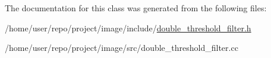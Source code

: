 The documentation for this class was generated from the following files\+:\begin{DoxyCompactItemize}
\item 
/home/user/repo/project/image/include/\hyperlink{double__threshold__filter_8h}{double\+\_\+threshold\+\_\+filter.\+h}\item 
/home/user/repo/project/image/src/double\+\_\+threshold\+\_\+filter.\+cc\end{DoxyCompactItemize}
